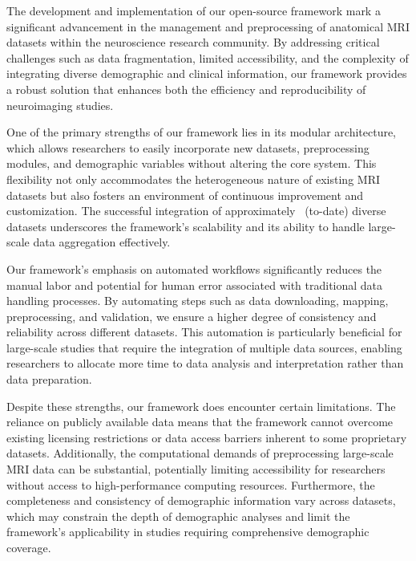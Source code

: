 

The development and implementation of our open-source framework mark a significant advancement in the 
management and preprocessing of anatomical MRI datasets within the neuroscience research community. 
By addressing critical challenges such as data fragmentation, limited accessibility, and the complexity 
of integrating diverse demographic and clinical information, our framework provides a robust solution 
that enhances both the efficiency and reproducibility of neuroimaging studies.

One of the primary strengths of our framework lies in its modular architecture, which allows researchers 
to easily incorporate new datasets, preprocessing modules, and demographic variables without altering the 
core system. This flexibility not only accommodates the heterogeneous nature of existing MRI datasets but 
also fosters an environment of continuous improvement and customization. The successful integration of 
approximately \NumDatasets\ (to-date) diverse datasets underscores the framework's scalability and its ability to handle 
large-scale data aggregation effectively.

Our framework's emphasis on automated workflows significantly reduces the manual labor and potential for 
human error associated with traditional data handling processes. By automating steps such as data downloading, 
mapping, preprocessing, and validation, we ensure a higher degree of consistency and reliability across 
different datasets. This automation is particularly beneficial for large-scale studies that require the 
integration of multiple data sources, enabling researchers to allocate more time to data analysis and 
interpretation rather than data preparation.


Despite these strengths, our framework does encounter certain limitations. The reliance on publicly available 
data means that the framework cannot overcome existing licensing restrictions or data access barriers inherent 
to some proprietary datasets. Additionally, the computational demands of preprocessing large-scale MRI data 
can be substantial, potentially limiting accessibility for researchers without access to high-performance 
computing resources. Furthermore, the completeness and consistency of demographic information vary across 
datasets, which may constrain the depth of demographic analyses and limit the framework's applicability in 
studies requiring comprehensive demographic coverage.

